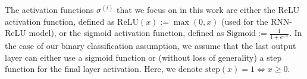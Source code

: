 The activation functions $\sigma^{(i)}$ that we focus on in this work are either the ReLU activation function, defined as $\text{ReLU}(x) := \max(0, x)$ (used for the RNN-ReLU model), or the sigmoid activation function, defined as $\text{Sigmoid}:=\frac{1}{1+e^{-x}}$. In the case of our binary classification assumption, we assume that the last output layer can either use a sigmoid function or (without loss of generality) a step function for the final layer activation. Here, we denote $\text{step}(x) = 1 \iff x \geq 0$.







